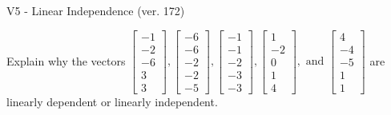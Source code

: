 \begin{exercise}
  \begin{exerciseTitle}V5 - Linear Independence (ver. 172)\end{exerciseTitle}
  \begin{exerciseStatement}
    Explain why the vectors \(\left[\begin{array}{r}
-1 \\
-2 \\
-6 \\
3 \\
3
\end{array}\right] , \left[\begin{array}{r}
-6 \\
-6 \\
-2 \\
-2 \\
-5
\end{array}\right] , \left[\begin{array}{r}
-1 \\
-1 \\
-2 \\
-3 \\
-3
\end{array}\right] , \left[\begin{array}{r}
1 \\
-2 \\
0 \\
1 \\
4
\end{array}\right] , \text{ and } \left[\begin{array}{r}
4 \\
-4 \\
-5 \\
1 \\
1
\end{array}\right]\) are linearly dependent or linearly independent.	



\end{exerciseStatement}
\end{exercise}
